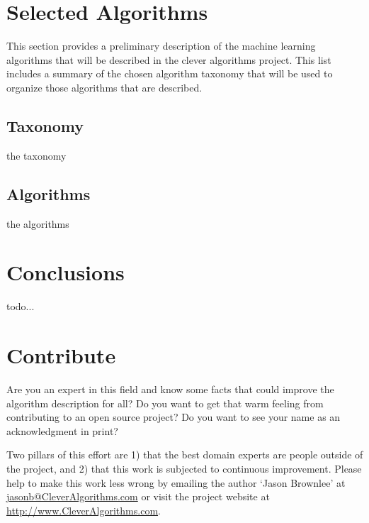 \documentclass[a4paper, 11pt]{article}
\makeatletter
\newcommand{\myreportauthor}{Jason Brownlee}
\newcommand{\myreportemail}{jasonb@CleverAlgorithms.com}
\newcommand{\myreportwebsite}{http://www.CleverAlgorithms.com}
\makeatother
\begin{document}
%
%
\section{Selected Algorithms}
\label{sec:selected}
This section provides a preliminary description of the machine learning algorithms that will be described in the clever algorithms project. This list includes a summary of the chosen algorithm taxonomy that will be used to organize those algorithms that are described. 

\subsection{Taxonomy}
the taxonomy


\subsection{Algorithms}
the algorithms



%
%
\section{Conclusions}
\label{sec:conclusions}
todo...




% 
% 
\section{Contribute}
\label{sec:contribute}
Are you an expert in this field and know some facts that could improve the algorithm description for all?
Do you want to get that warm feeling from contributing to an open source project? 
Do you want to see your name as an acknowledgment in print?

Two pillars of this effort are 1) that the best domain experts are people outside of the project, and 2) that this work is subjected to continuous improvement. 
Please help to make this work less wrong by emailing the author `\myreportauthor' at \url{\myreportemail} or visit the project website at \url{\myreportwebsite}.



\end{document}

